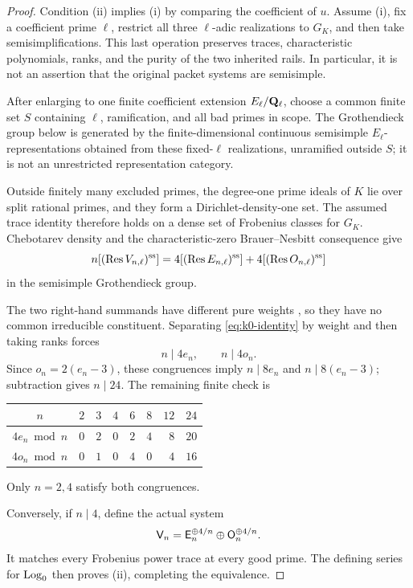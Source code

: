\begin{proof}
Condition (ii) implies (i) by comparing the coefficient of \(u\).
Assume (i), fix a coefficient prime \(\ell\), restrict all three
\(\ell\)-adic realizations to \(G_K\), and then take
semisimplifications.  This last operation preserves traces, characteristic
polynomials, ranks, and the purity of the two inherited rails.  In
particular, it is not an assertion that the original packet systems are
semisimple.

After enlarging to one finite coefficient extension \(E_\ell/\mathbf Q_\ell\), choose
a common finite set \(S\) containing \(\ell\), ramification, and all bad
primes in scope.  The Grothendieck group below is generated by the
finite-dimensional continuous semisimple \(E_\ell\)-representations
obtained from these fixed-\(\ell\) realizations, unramified outside \(S\);
it is not an unrestricted representation category.

Outside finitely many excluded primes, the degree-one prime ideals of \(K\)
lie over split rational primes, and they form a Dirichlet-density-one set.
The assumed trace identity therefore holds on a dense set of Frobenius
classes for \(G_K\).  Chebotarev density
\cite[\S2.1, Theorem 1]{Serre1981} and the characteristic-zero
Brauer--Nesbitt consequence \cite{BrauerNesbitt1941} give
\begin{equation}
n[(\operatorname{Res} V_{n,\ell})^{\mathrm{ss}}]
=4[(\operatorname{Res} E_{n,\ell})^{\mathrm{ss}}]
+4[(\operatorname{Res} O_{n,\ell})^{\mathrm{ss}}]
\label{eq:k0-identity}
\end{equation}
in the semisimple Grothendieck group.

The two right-hand summands have different pure weights
\cite[\S1.2, especially (1.2.2) and (1.2.5)(i)]{Deligne1980}, so they
have no common irreducible constituent.
Separating \eqref{eq:k0-identity} by weight and then taking ranks forces
\begin{equation}
n\mid4e_n,\qquad n\mid4o_n.
\label{eq:rank-divisibility}
\end{equation}
Since \(o_n=2(e_n-3)\), these congruences imply
\(n\mid8e_n\) and \(n\mid8(e_n-3)\); subtraction gives \(n\mid24\).
The remaining finite check is
\begin{center}
\begin{tabular}{@{}c|rrrrrrr@{}}
\toprule
\(n\) & \(2\) & \(3\) & \(4\) & \(6\) & \(8\) & \(12\) & \(24\)\\
\midrule
\(4e_n\bmod n\) & \(0\) & \(2\) & \(0\) & \(2\) & \(4\) & \(8\) & \(20\)\\
\(4o_n\bmod n\) & \(0\) & \(1\) & \(0\) & \(4\) & \(0\) & \(4\) & \(16\)\\
\bottomrule
\end{tabular}
\end{center}
Only \(n=2,4\) satisfy both congruences.

Conversely, if \(n\mid4\), define the actual system
\begin{equation}
\mathsf V_n=
\mathsf E_n^{\oplus 4/n}\oplus
\mathsf O_n^{\oplus 4/n}.
\label{eq:direct-copy-converse}
\end{equation}
It matches every Frobenius power trace at every good prime.  The defining
series for \(\operatorname{Log}_0\) then proves (ii), completing the equivalence.
\end{proof}

